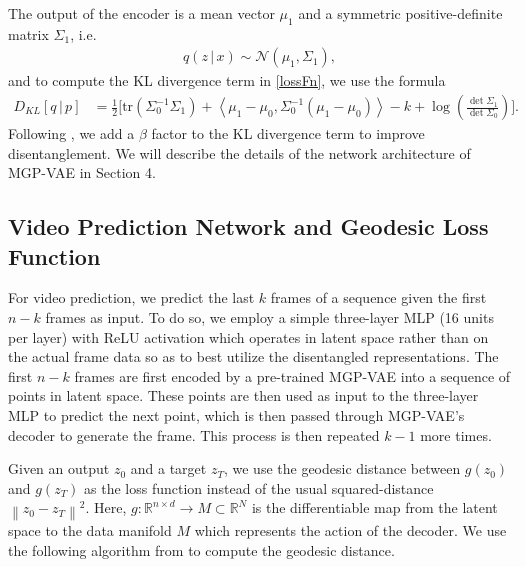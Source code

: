 \documentclass[runningheads]{llncs}
\newcommand{\norm}[1]{\left\lVert#1\right\rVert}
\begin{document}
   The output of the encoder is a mean vector $\mu_1$ and a symmetric positive-definite matrix $\Sigma_1$, i.e.
   \begin{align}
   q(z \,|\, x) \sim \mathcal{N} (\mu_1, \Sigma_1),
   \end{align}
   and to compute the KL divergence term in \eqref{lossFn}, we use the formula
   \small 
   \begin{align}
   D_{KL} \left[ q \, | \, p \right] 
   &= \frac{1}{2} \bigg[ \mathrm{tr} \left( \Sigma_0^{-1} \Sigma_1 \right) + \left\langle \mu_1 - \mu_0, \Sigma_0^{-1} (\mu_1 - \mu_0) \right\rangle - k + \log \left(\frac{\det \Sigma_1}{\det \Sigma_0}\right) \bigg].
   \end{align}
   \normalsize
   Following \cite{Higgins2017betaVAELB}, we add a $\beta$ factor to the KL divergence term to improve disentanglement. We will describe the details of the network architecture of MGP-VAE in Section 4.

   \subsection{Video Prediction Network and Geodesic Loss Function} 

   For video prediction, we predict the last $k$ frames of a sequence given the first $n-k$ frames as input. To do so, we employ a simple three-layer MLP (16 units per layer) with ReLU activation which operates in latent space rather than on the actual frame data so as to best utilize the disentangled representations. The first $n-k$ frames are first encoded by a pre-trained MGP-VAE into a sequence of points in latent space. These points are then used as input to the three-layer MLP to predict the next point, which is then passed through MGP-VAE's decoder to generate the frame. This process is then repeated $k-1$ more times. \par 
   
	Given an output $z_0$ and a target $z_T$, we use the geodesic distance between $g(z_0)$ and $g(z_T)$ as the loss function instead of the usual squared-distance $\norm{z_0 - z_T}^2$. Here, $g: \mathbb{R}^{n \times d} \rightarrow M \subset \mathbb{R}^N$ is the differentiable map from the latent space to the data manifold $M$ which represents the action of the decoder. We use the following algorithm from \cite{Shao2017TheRG} to compute the geodesic distance.
   
\end{document}
